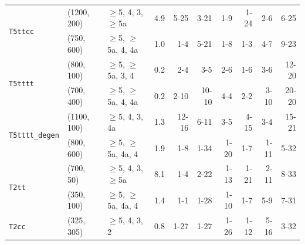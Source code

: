 \begin{table}[tb]
\begin{tabular}{ lllcrrrrrr }
    \multirow{2}{*}{\texttt{T5ttcc}}                                                                                                                     
                                               & (1200, 200) & $\geq$5, 4, 3, $\geq$5a  & \phantom{1}4.9 & 5-25  & 3-21    & 1-9  & 1-24 & 2-6  & 6-25  \\
                                               & (750, 600)  & $\geq$5, $\geq$5a, 4, 4a & \phantom{1}1.0 & 1-4   & 5-21    & 1-8  & 1-3  & 4-7  & 9-23  \\ [0.5ex]
    \multirow{2}{*}{\texttt{T5tttt}}                                                                                                                     
                                               & (800, 100)  & $\geq$5, $\geq$5a, 3, 4  & \phantom{1}0.2 & 2-4   & 3-5     & 2-6  & 1-6  & 3-6  & 12-20 \\
                                               & (700, 400)  &
                                               $\geq$5, $\geq$5a, 4, 4a%
                                               & \phantom{1}0.2 & 2-10  & 10-10   & 4-4  & 2-2  & 3-10 & 20-20 \\ [0.5ex]
    \multirow{2}{*}{\texttt{T5tttt\_degen}}                                                                                                              
                                               & (1100, 100) & $\geq$5, 4, 3, 4a        & \phantom{1}1.3 & 12-16 & 6-11    & 3-5  & 4-15 & 3-4  & 15-21 \\
                                               & (800, 600)  & $\geq$5, $\geq$5a, 4a, 4 & \phantom{1}1.9 & 1-8   & 1-34    & 1-20 & 1-7  & 1-11 & 5-32  \\ [0.5ex]
    \multirow{2}{*}{\texttt{T2tt}}                                                                                                                       
                                               & (700, 50)   & $\geq$5, 4, 3, $\geq$5a  & \phantom{1}8.1 & 1-4   & 2-22    & 1-13 & 1-21 & 2-11 & 8-33  \\
                                               & (350, 100)  & $\geq$5, $\geq$5a, 4a, 4 & \phantom{1}1.4 & 1-1   & 1-28    & 1-10 & 1-7  & 5-9  & 7-31  \\ [0.5ex]
    \multirow{1}{*}{\texttt{T2cc}}                                                                                                                       
                                               & (325, 305)  & $\geq$5, 4, 3, 2         & \phantom{1}0.8 & 1-27  & 1-27    & 1-26 & 1-12 & 5-16 & 3-32  \\ [0.5ex]

\end{tabular}
\end{table}
